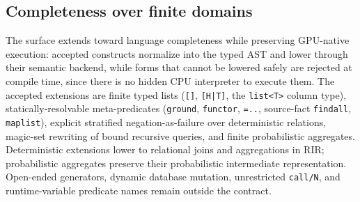 

\subsection{Completeness over finite domains}\label{sec:lang:completeness}

The surface extends toward language completeness while preserving GPU-native execution: accepted constructs normalize into the typed AST and lower through their semantic backend, while forms that cannot be lowered safely are rejected at compile time, since there is no hidden CPU interpreter to execute them. The accepted extensions are finite typed lists (\texttt{[]}, \texttt{[H|T]}, the \texttt{list<T>} column type), statically-resolvable meta-predicates (\texttt{ground}, \texttt{functor}, \texttt{=..}, source-fact \texttt{findall}, \texttt{maplist}), explicit stratified negation-as-failure over deterministic relations, magic-set rewriting of bound recursive queries, and finite probabilistic aggregates. Deterministic extensions lower to relational joins and aggregations in RIR; probabilistic aggregates preserve their probabilistic intermediate representation. Open-ended generators, dynamic database mutation, unrestricted \texttt{call/N}, and runtime-variable predicate names remain outside the contract.
